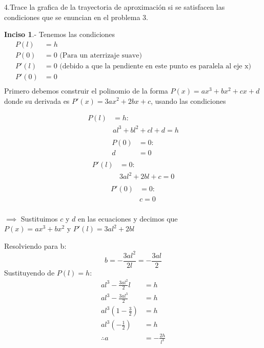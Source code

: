 \vspace{10pt}

\noindent 4.Trace la grafica de la trayectoria de aproximación si se satisfacen las condiciones que se enuncian en el problema 3.

\textbf{Inciso 1}.- Tenemos las condiciones
\begin{align*}
	P(l)  & =h                                                                       \\
	P(0)  & =0\text{ (Para un aterrizaje suave)}                                     \\
	P'(l) & =0\text{ (debido a que la pendiente en este punto es paralela al eje x)} \\
	P'(0) & =0                                                                       \\
\end{align*}
Primero debemos construir el polinomio de la forma $P(x)= ax^3+ bx^2 + cx + d$ donde su derivada es $P'(x)= 3ax^2+2bx +c$, usando las condiciones

\begin{multicols}{4}
	\noindent
	\begin{align*}
		P(l) & =h:                   \\
		     & al^3+ bl^2 + cl + d=h \\
	\end{align*}
	\columnbreak
	\begin{align*}
		P(0) & =0: \\
		d    & =0  \\
	\end{align*}
	\columnbreak
	\begin{align*}
		P'(l) & =0:            \\
		      & 3al^2+2bl +c=0 \\
	\end{align*}
	\columnbreak
	\begin{align*}
		P'(0) & =0: \\
		      & c=0 \\
	\end{align*}
\end{multicols}

$\implies$ Sustituimos $c$ y $d$ en las ecuaciones y decimos que $P(x)=ax^3+ bx^2 \text{ y } P'(l)= 3al^2+2bl$

Resolviendo para b:
$$b = -\frac{3al^2}{2l} = -\frac{3al}{2}$$
Sustituyendo de $P(l)=h$:
\begin{align*}
	al^3 - \frac{3al^2}{2}l           & = h               \\
	al^3 - \frac{3al^3}{2}            & = h               \\
	al^3 \left(1 - \frac{3}{2}\right) & = h               \\
	al^3 \left(-\frac{1}{2}\right)    & = h               \\
	\therefore a                      & = -\frac{2h}{l^3} \\
\end{align*}

